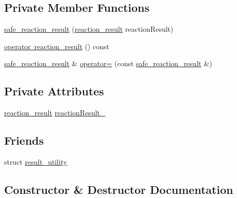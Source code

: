 \subsection*{Private Member Functions}
\begin{DoxyCompactItemize}
\item 
\mbox{\hyperlink{classboost_1_1statechart_1_1detail_1_1safe__reaction__result_a6143b679397635f495eb59db00bc810b}{safe\+\_\+reaction\+\_\+result}} (\mbox{\hyperlink{namespaceboost_1_1statechart_1_1detail_ab091bbb4c29327fb46ee479ea1b7255b}{reaction\+\_\+result}} reaction\+Result)
\item 
\mbox{\hyperlink{classboost_1_1statechart_1_1detail_1_1safe__reaction__result_ae9ccc4d7841823cb18cf2b46c9f25745}{operator reaction\+\_\+result}} () const
\item 
\mbox{\hyperlink{classboost_1_1statechart_1_1detail_1_1safe__reaction__result}{safe\+\_\+reaction\+\_\+result}} \& \mbox{\hyperlink{classboost_1_1statechart_1_1detail_1_1safe__reaction__result_a7c4444bb0343b71d91351e603d204675}{operator=}} (const \mbox{\hyperlink{classboost_1_1statechart_1_1detail_1_1safe__reaction__result}{safe\+\_\+reaction\+\_\+result}} \&)
\end{DoxyCompactItemize}
\subsection*{Private Attributes}
\begin{DoxyCompactItemize}
\item 
\mbox{\hyperlink{namespaceboost_1_1statechart_1_1detail_ab091bbb4c29327fb46ee479ea1b7255b}{reaction\+\_\+result}} \mbox{\hyperlink{classboost_1_1statechart_1_1detail_1_1safe__reaction__result_a9ad8757fede0a4eba20b9e9759ac92a4}{reaction\+Result\+\_\+}}
\end{DoxyCompactItemize}
\subsection*{Friends}
\begin{DoxyCompactItemize}
\item 
struct \mbox{\hyperlink{classboost_1_1statechart_1_1detail_1_1safe__reaction__result_a81d9592cc037fa7b95ae413b3902d607}{result\+\_\+utility}}
\end{DoxyCompactItemize}


\subsection{Constructor \& Destructor Documentation}
\mbox{\label{classboost_1_1statechart_1_1detail_1_1safe__reaction__result_a6b06eb2544846a2fefd144a559b1f1e7}} 
